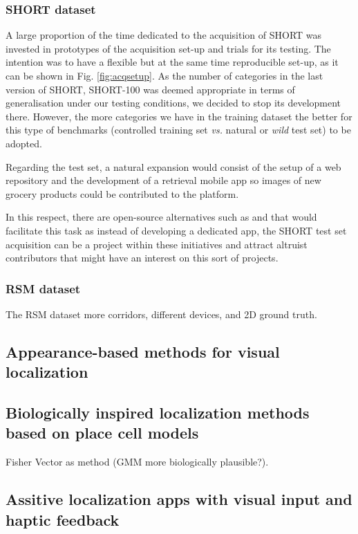 \subsubsection{SHORT dataset}

A large proportion of the time dedicated to the acquisition of SHORT was invested in prototypes of the acquisition set-up and trials for its testing. The intention was to have a flexible but at the same time reproducible set-up, as it can be shown in Fig. \ref{fig:acqsetup}. As the number of categories in the last version of SHORT, SHORT-100 was deemed appropriate in terms of generalisation under our testing conditions, we decided to stop its development there. However, the more categories we have in the training dataset the better for this type of benchmarks (controlled training set \textit{vs.} natural or \textit{wild} test set) to be adopted.

Regarding the test set, a natural expansion would consist of the setup of a web repository and the development of a retrieval mobile app so images of new grocery products could be contributed to the platform.

In this respect, there are open-source alternatives such as \cite{apple} and \cite{google} that would facilitate this task as instead of developing a dedicated app, the SHORT test set acquisition can be a project within these initiatives and attract altruist contributors that might have an interest on this sort of projects.

\subsubsection{RSM dataset}

The RSM dataset more corridors, different devices, and 2D ground truth.

\subsection{Appearance-based methods for visual localization}

\subsection{Biologically inspired localization methods based on place cell models}
Fisher Vector as method (GMM more biologically plausible?).
\subsection{Assitive localization apps with visual input and haptic feedback}


